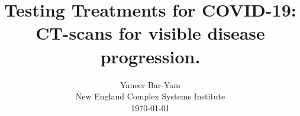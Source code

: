 \documentclass[onecolumn,journal]{IEEEtran}
\begin{document}
\title{\color{Brown} Testing Treatments for COVID-19: \\ CT-scans for visible disease progression.  \\
\vspace{-0.35ex}}
\author{Yaneer Bar-Yam \\ New England Complex Systems Institute \\
 \today 
  \vspace{-14ex} \\ 

   
\bigskip
\bigskip

\textbf{}
 }
    
\maketitle


\flushbottom %



\thispagestyle{empty} %




\renewcommand{\thefootnote}{\fnsymbol{footnote}}
\end{document}
